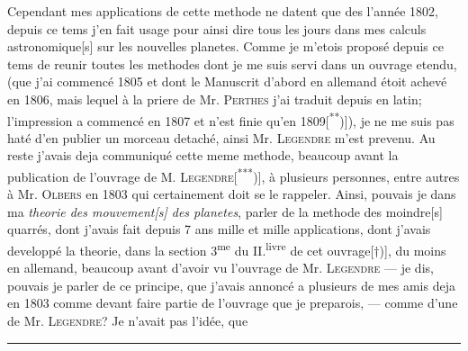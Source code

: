 Cependant mes applications  de cette methode ne datent que des l’année 1802, depuis ce tems j’en fait usage pour ainsi dire tous les jours dans mes calculs astronomique[s] sur les nouvelles planetes. Comme je m’etois proposé depuis ce tems de reunir toutes les methodes dont je me suis servi dans un ouvrage etendu, (que j’ai commencé 1805 et dont le Manuscrit d’abord en allemand étoit achevé en 1806, mais lequel à la priere de Mr. \textsc{Perthes} j’ai traduit depuis en latin; l’impression a commencé en 1807 et n’est finie qu’en 1809[\textsuperscript{**})]), je ne me suis pas haté d’en publier un morceau detaché, ainsi Mr. \textsc{Legendre} m’est prevenu. Au reste j’avais deja communiqué cette meme methode, beaucoup avant la publication de l’ouvrage de M. \textsc{Legendre}[\textsuperscript{***})], à plusieurs personnes, entre autres à Mr. \textsc{Olbers} en 1803 qui certainement doit se le rappeler. Ainsi, pouvais je dans ma \textit{theorie des mouvement\textup{[s]} des planetes}, parler de la methode des moindre[s] quarrés, dont j’avais fait depuis 7 ans mille et mille applications, dont j’avais developpé la theorie, dans la section 3\textsuperscript{me} du II.\textsuperscript{livre} de cet ouvrage[$\dagger$)], du moins en allemand, beaucoup avant d’avoir vu l’ouvrage de Mr. \textsc{Legendre} — je dis, pouvais je parler de ce principe, que j’avais annoncé a plusieurs de mes amis deja en 1803 comme devant faire partie de l’ouvrage que je preparois, — comme d’une  de Mr. \textsc{Legendre}? Je n’avait pas l’idée, que
\par\medskip\noindent\rule{.24\linewidth}{.4pt}\par\smallskip
